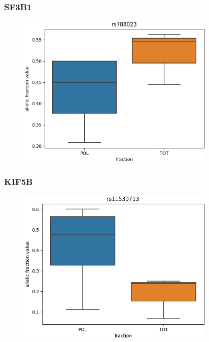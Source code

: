 \documentclass{beamer}
\begin{document}
	\begin{frame}
		\frametitle{SF3B1}
		\begin{figure}
			\includegraphics[width=0.84\textwidth]{media/scr_NUTLIN_rs788023.png}
		\end{figure}
	\end{frame}
	\begin{frame}
		\frametitle{KIF5B}
		\begin{figure}
			\includegraphics[width=0.84\textwidth]{media/shDHX30_DMSO_rs11539713.png}
		\end{figure}
	\end{frame}
\end{document}
